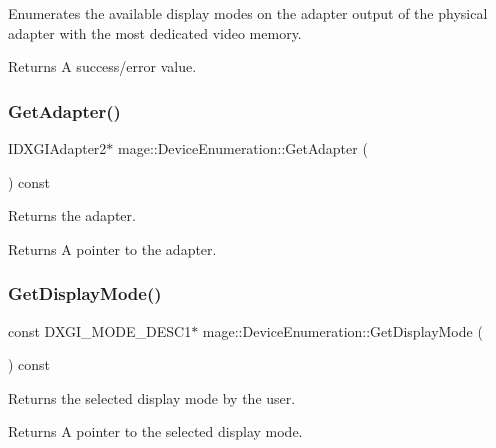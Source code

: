 Enumerates the available display modes on the adapter output of the physical adapter with the most dedicated video memory.

\begin{DoxyReturn}{Returns}
A success/error value. 
\end{DoxyReturn}
\hypertarget{classmage_1_1_device_enumeration_a7bdbc5aad3cd2578db6ed8c4aaffd34d}{}\label{classmage_1_1_device_enumeration_a7bdbc5aad3cd2578db6ed8c4aaffd34d} 
\subsubsection{\texorpdfstring{Get\+Adapter()}{GetAdapter()}}
{\footnotesize\ttfamily I\+D\+X\+G\+I\+Adapter2$\ast$ mage\+::\+Device\+Enumeration\+::\+Get\+Adapter (\begin{DoxyParamCaption}{ }\end{DoxyParamCaption}) const}

Returns the adapter.

\begin{DoxyReturn}{Returns}
A pointer to the adapter. 
\end{DoxyReturn}
\hypertarget{classmage_1_1_device_enumeration_a533ac2f6ea91604a3ea3cc8d93c3de87}{}\label{classmage_1_1_device_enumeration_a533ac2f6ea91604a3ea3cc8d93c3de87} 
\subsubsection{\texorpdfstring{Get\+Display\+Mode()}{GetDisplayMode()}}
{\footnotesize\ttfamily const D\+X\+G\+I\+\_\+\+M\+O\+D\+E\+\_\+\+D\+E\+S\+C1$\ast$ mage\+::\+Device\+Enumeration\+::\+Get\+Display\+Mode (\begin{DoxyParamCaption}{ }\end{DoxyParamCaption}) const}

Returns the selected display mode by the user.

\begin{DoxyReturn}{Returns}
A pointer to the selected display mode. 
\end{DoxyReturn}
\hypertarget{classmage_1_1_device_enumeration_a8957ecacc567708e80694b25aa141c4e}{}\label{classmage_1_1_device_enumeration_a8957ecacc567708e80694b25aa141c4e} 
